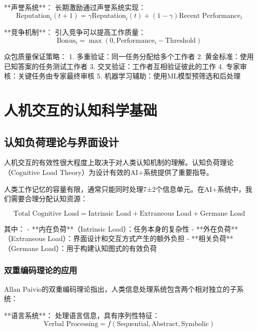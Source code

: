 **声誉系统**：
长期激励通过声誉系统实现：
\begin{equation}
\text{Reputation}_i(t+1) = \gamma \text{Reputation}_i(t) + (1-\gamma) \text{Recent Performance}_i
\end{equation}

**竞争机制**：
引入竞争可以提高工作质量：
\begin{equation}
\text{Bonus}_i = \max(0, \text{Performance}_i - \text{Threshold})
\end{equation}

\begin{center}
众包质量保证策略：
1. 多重验证：同一任务分配给多个工作者
2. 黄金标准：使用已知答案的任务测试工作者
3. 交叉验证：工作者互相验证彼此的工作
4. 专家审核：关键任务由专家最终审核
5. 机器学习辅助：使用ML模型预筛选和后处理
\end{center}

\section{人机交互的认知科学基础}

\subsection{认知负荷理论与界面设计}

人机交互的有效性很大程度上取决于对人类认知机制的理解。认知负荷理论（Cognitive Load Theory）为设计有效的AI+系统提供了重要指导。

人类工作记忆的容量有限，通常只能同时处理7±2个信息单元。在AI+系统中，我们需要合理分配认知资源：

\begin{equation}
\text{Total Cognitive Load} = \text{Intrinsic Load} + \text{Extraneous Load} + \text{Germane Load}
\end{equation}

其中：
- **内在负荷**（Intrinsic Load）：任务本身的复杂性
- **外在负荷**（Extraneous Load）：界面设计和交互方式产生的额外负担
- **相关负荷**（Germane Load）：用于构建认知图式的有效负荷

\subsubsection{双重编码理论的应用} %

Allan Paivio的双重编码理论指出，人类信息处理系统包含两个相对独立的子系统：

**语言系统**：
处理语言信息，具有序列性特征：
\begin{equation}
\text{Verbal Processing} = f(\text{Sequential}, \text{Abstract}, \text{Symbolic})
\end{equation}

